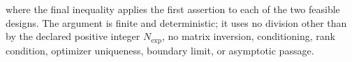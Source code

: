 where the final inequality applies the first assertion to each of the two feasible designs.  The argument is finite and deterministic; it uses no division other than by the declared positive integer \(N_{\exp}\), no matrix inversion, conditioning, rank condition, optimizer uniqueness, boundary limit, or asymptotic passage.
